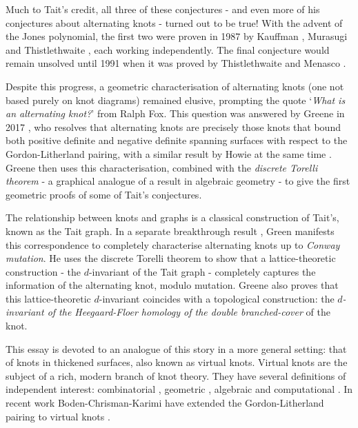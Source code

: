\documentclass[12pt]{report}
\theoremstyle{upright}
\begin{document}
Much to Tait's credit, all three of these conjectures - and even more of his conjectures about alternating knots - turned out to be true! With the advent of the Jones polynomial, the first two were proven in 1987 by Kauffman \cite{state-models-jones-polynomial}, Murasugi \cite{jones-polynomials-classical-conjectures} and Thistlethwaite \cite{spanning-tree-expansion-jones-polynomial}, each working independently. The final conjecture would remain unsolved until 1991 when it was proved by Thistlethwaite and Menasco \cite{classification-alternating-links}.

Despite this progress, a geometric characterisation of alternating knots (one not based purely on knot diagrams) remained elusive, prompting the quote `\textit{What is an alternating knot?}' from Ralph Fox. This question was answered by Greene in 2017 \cite{alternating-links-definite-surfaces}, who resolves that alternating knots are precisely those knots that bound both positive definite and negative definite spanning surfaces with respect to the Gordon-Litherland pairing, with a similar result by Howie at the same time \cite{characterisation-alternating-knot-exteriors}. Greene then uses this characterisation, combined with the \textit{discrete Torelli theorem} - a graphical analogue of a result in algebraic geometry - to give the first geometric proofs of some of Tait's conjectures.

The relationship between knots and graphs is a classical construction of Tait's, known as the Tait graph. In a separate breakthrough result \cite{lattices-graphs-mutation}, Green manifests this correspondence to completely characterise alternating knots up to \textit{Conway mutation}. He uses the discrete Torelli theorem to show that a lattice-theoretic construction - the $d$-invariant of the Tait graph - completely captures the information of the alternating knot, modulo mutation. Greene also proves that this lattice-theoretic $d$-invariant coincides with a topological construction: the \textit{$d$-invariant of the Heegaard-Floer homology of the double branched-cover} of the knot.

This essay is devoted to an analogue of this story in a more general setting: that of knots in thickened surfaces, also known as virtual knots. Virtual knots are the subject of a rich, modern branch of knot theory. They have several definitions of independent interest: combinatorial \cite{virtual-knot-theory, finite-type-invariants-classical-virtual}, geometric \cite{what-is-a-virtual-link, stable-equivalence-virtual-cobordisms}, algebraic \cite{w-knotted-i, w-knotted-ii} and computational \cite{virtual-knot-theory}. In recent work Boden-Chrisman-Karimi have extended the Gordon-Litherland pairing to virtual knots \cite{gordon-litherland-pairing-thickened-surfaces}.
\end{document}
